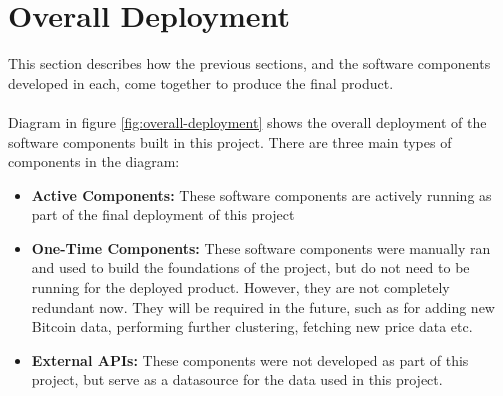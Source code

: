 \chapter{Overall Deployment}
This section describes how the previous sections, and the software components developed in each, come together to produce the final product.
\\\\
Diagram in figure \ref{fig:overall-deployment} shows the overall deployment of the software components built in this project. There are three main types of components in the diagram: 
\begin{itemize}
    \item \textbf{Active Components:} These software components are actively running as part of the final deployment of this project
    \item \textbf{One-Time Components:} These software components were manually ran and used to build the foundations of the project, but do not need to be running for the deployed product. However, they are not completely redundant now. They will be required in the future, such as for adding new Bitcoin data, performing further clustering, fetching new price data etc.
    \item \textbf{External APIs:} These components were not developed as part of this project, but serve as a datasource for the data used in this project. 
\end{itemize}

